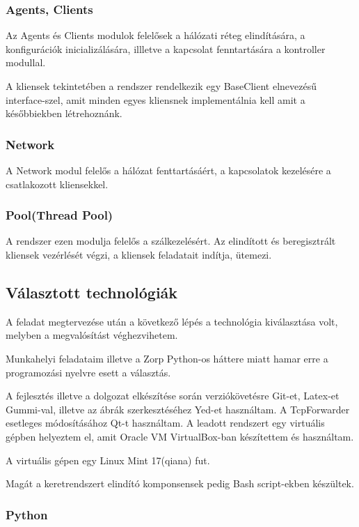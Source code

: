 \documentclass[a4paper,12pt,oneside]{report}
\begin{document}
\subsubsection{Agents, Clients}

Az Agents és Clients modulok felelősek a hálózati réteg elindítására, a konfigurációk inicializálására, illletve a kapcsolat fenntartására a kontroller modullal.

A kliensek tekintetében a rendszer rendelkezik egy BaseClient elnevezésű interface-szel, amit minden egyes kliensnek implementálnia kell amit a későbbiekben létrehoznánk.

\subsubsection{Network}
A Network modul felelős a hálózat fenttartásáért, a kapcsolatok kezelésére a csatlakozott kliensekkel.
	
\subsubsection{Pool(Thread Pool)}

A rendszer ezen modulja felelős a szálkezelésért.
Az elindított és beregisztrált kliensek vezérlését végzi, a kliensek feladatait indítja, ütemezi.

\subsection{Választott technológiák}

A feladat megtervezése után a következő lépés a technológia kiválasztása volt, melyben a megvalósítást véghezvihetem. 

Munkahelyi feladataim illetve a Zorp Python-os háttere miatt hamar erre a programozási nyelvre esett a választás.

A fejlesztés illetve a dolgozat elkészítése során verziókövetésre Git-et, Latex-et Gummi-val, illetve az ábrák szerkesztéséhez Yed-et használtam.
A TcpForwarder esetleges módosításához Qt-t használtam.
A leadott rendszert egy virtuális gépben helyeztem el, amit Oracle VM VirtualBox-ban készítettem és használtam. \cite{website:vbox}

A virtuális gépen egy Linux Mint 17(qiana) fut. \cite{website:linuxmint}

Magát a keretrendszert elindító komponsensek pedig Bash script-ekben készültek.

\subsubsection{Python}
\cite{website:python}
\end{document}
